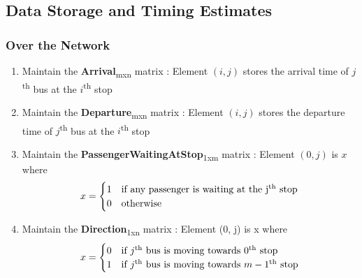 \subsection{Data Storage and Timing Estimates}
\subsubsection{Over the Network}

\begin{enumerate}

\item Maintain the \textbf{Arrival}\textsubscript{mxn} matrix : Element $(i, j)$ stores the arrival time of $j$\textsuperscript{th} bus at the $i$\textsuperscript{th} stop
\item Maintain the \textbf{Departure}\textsubscript{mxn} matrix : Element $(i, j)$ stores the departure time of $j$\textsuperscript{th} bus at the $i$\textsuperscript{th} stop
\item Maintain the \textbf{PassengerWaitingAtStop}\textsubscript{1xm} matrix : Element $(0, j)$ is $x$ where
 \[ x = \begin{cases} \mbox{1} & \mbox{if any passenger is waiting at the j\textsuperscript{th} stop}  \\ \mbox{0} & \mbox{otherwise} \end{cases} \]
\item Maintain the \textbf{Direction}\textsubscript{1xn} matrix : Element (0, j) is x where
 \[ x = \begin{cases} \mbox{0} & \mbox{if $j$\textsuperscript{th} bus is moving towards $0$\textsuperscript{th} stop}  \\ \mbox{1} & \mbox{if $j$\textsuperscript{th} bus is moving towards $m-1$\textsuperscript{th} stop} \end{cases} \]


\end{enumerate}